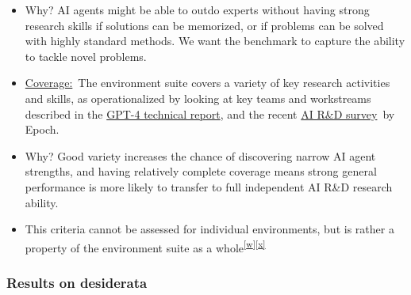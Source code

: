 \documentclass[
]{article}
\providecommand{\tightlist}{%
  \setlength{\itemsep}{0pt}\setlength{\parskip}{0pt}}
\begin{document}
\begin{itemize}
\tightlist
\item
  {Why? AI agents might be able to outdo experts without having strong
  research skills if solutions can be memorized, or if problems can be
  solved with highly standard methods. We want the benchmark to capture
  the ability to tackle novel problems.}
\end{itemize}

\begin{itemize}
\tightlist
\item
  {\hyperref[h.qt7srnrx8j84]{Coverage:}}{~}{The environment suite covers
  a variety of key research activities and skills, as operationalized by
  looking at key teams and workstreams described in the
  }{\href{https://www.google.com/url?q=https://arxiv.org/pdf/2303.08774&sa=D&source=editors&ust=1727392285019629&usg=AOvVaw0Gwmy43ooZ_4YykKMAux5R}{GPT-4
  technical report}}{, and the recent
  }{\href{https://www.google.com/url?q=https://epochai.org/files/Interviewing_AI_researchers_on_automation_of_AI_R_D.pdf&sa=D&source=editors&ust=1727392285019994&usg=AOvVaw3s4UCmhGh6lLWj6g8fWipa}{AI
  R\&D survey}}{~by Epoch. }
\end{itemize}

\begin{itemize}
\tightlist
\item
  {Why? Good variety increases the chance of discovering narrow AI agent
  strengths, and having relatively complete coverage means strong
  general performance is more likely to transfer to full independent AI
  R\&D research ability. }
\item
  {This criteria cannot be assessed for individual environments, but is
  rather a property of the environment suite as a
  whole}\textsuperscript{\label{cmnt_ref23}\hyperref[cmnt23]{{[}w{]}}\label{cmnt_ref24}\hyperref[cmnt24]{{[}x{]}}}
\end{itemize}

\subsubsection{\texorpdfstring{{Results on
desiderata}}{Results on desiderata}}\label{h.5d5efnrzhbo}

{}
\end{document}
